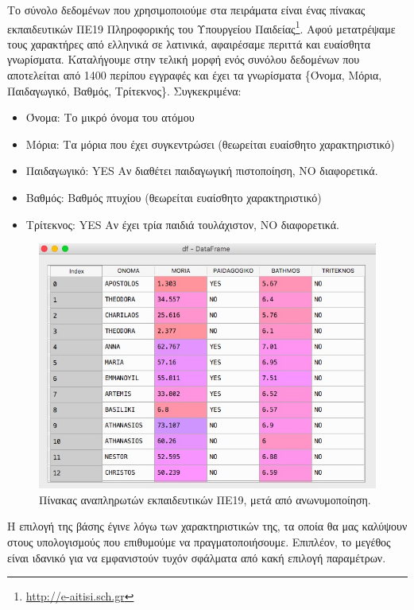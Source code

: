 \clearpage
Το σύνολο δεδομένων που χρησιμοποιούμε στα πειράματα είναι ένας πίνακας εκπαιδευτικών ΠΕ19 Πληροφορικής του Υπουργείου Παιδείας\footnote{\textlatin{\url{http://e-aitisi.sch.gr}}}. Αφού μετατρέψαμε τους χαρακτήρες από ελληνικά σε λατινικά, αφαιρέσαμε περιττά και ευαίσθητα γνωρίσματα. Καταλήγουμε στην τελική μορφή ενός συνόλου δεδομένων που αποτελείται από 1400 περίπου εγγραφές και έχει τα γνωρίσματα \{Όνομα, Μόρια, Παιδαγωγικό, Βαθμός, Τρίτεκνος\}. Συγκεκριμένα:
\begin{itemize}
    \item Όνομα: Το μικρό όνομα του ατόμου
    \item Μόρια: Τα μόρια που έχει συγκεντρώσει (θεωρείται ευαίσθητο χαρακτηριστικό)
   \item Παιδαγωγικό: \textlatin{YES} Αν διαθέτει παιδαγωγική πιστοποίηση, \textlatin{NO} διαφορετικά.
   \item Βαθμός: Βαθμός πτυχίου (θεωρείται ευαίσθητο χαρακτηριστικό)
   \item Τρίτεκνος: \textlatin{YES} Αν έχει τρία παιδιά τουλάχιστον, \textlatin{NO} διαφορετικά.
    
    
\end{itemize}


\begin{figure} [ht]
\begin{center}
  \includegraphics[scale=0.55]{images/DF.jpg}
  \caption{Πίνακας αναπληρωτών εκπαιδευτικών ΠΕ19, μετά από ανωνυμοποίηση.}
  \end{center}
\end{figure}


Η επιλογή της βάσης έγινε λόγω των χαρακτηριστικών της, τα οποία θα μας καλύψουν στους υπολογισμούς που επιθυμούμε να πραγματοποιήσουμε. Επιπλέον, το μεγέθος είναι ιδανικό για να εμφανιστούν τυχόν σφάλματα από κακή επιλογή παραμέτρων. 






